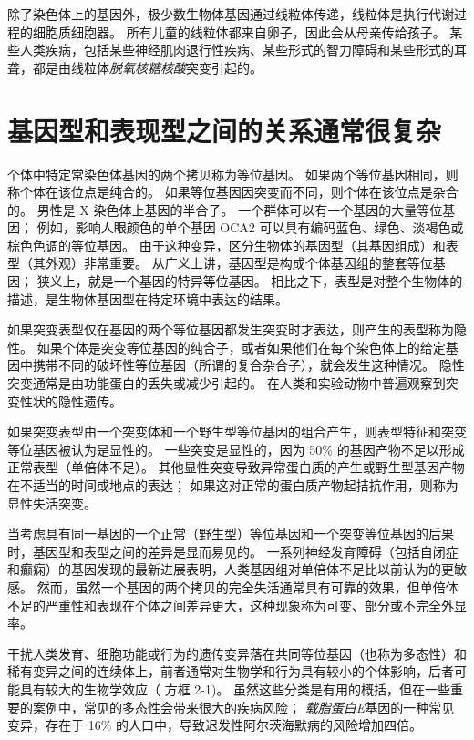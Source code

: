 除了染色体上的基因外，极少数生物体基因通过线粒体传递，线粒体是执行代谢过程的细胞质细胞器。 
所有儿童的线粒体都来自卵子，因此会从母亲传给孩子。 某些人类疾病，包括某些神经肌肉退行性疾病、某些形式的智力障碍和某些形式的耳聋，都是由线粒体\textit{脱氧核糖核酸}突变引起的。


\section{基因型和表现型之间的关系通常很复杂}

个体中特定常染色体基因的两个拷贝称为等位基因。 
如果两个等位基因相同，则称个体在该位点是纯合的。 
如果等位基因因突变而不同，则个体在该位点是杂合的。 男性是 X 染色体上基因的半合子。 
一个群体可以有一个基因的大量等位基因； 
例如，影响人眼颜色的单个基因 OCA2 可以具有编码蓝色、绿色、淡褐色或棕色色调的等位基因。 
由于这种变异，区分生物体的基因型（其基因组成）和表型（其外观）非常重要。 
从广义上讲，基因型是构成个体基因组的整套等位基因； 狭义上，就是一个基因的特异等位基因。 
相比之下，表型是对整个生物体的描述，是生物体基因型在特定环境中表达的结果。

如果突变表型仅在基因的两个等位基因都发生突变时才表达，则产生的表型称为隐性。 
如果个体是突变等位基因的纯合子，或者如果他们在每个染色体上的给定基因中携带不同的破坏性等位基因（所谓的复合杂合子），就会发生这种情况。 
隐性突变通常是由功能蛋白的丢失或减少引起的。 
在人类和实验动物中普遍观察到突变性状的隐性遗传。


如果突变表型由一个突变体和一个野生型等位基因的组合产生，则表型特征和突变等位基因被认为是显性的。 
一些突变是显性的，因为 50\% 的基因产物不足以形成正常表型（单倍体不足）。 
其他显性突变导致异常蛋白质的产生或野生型基因产物在不适当的时间或地点的表达； 
如果这对正常的蛋白质产物起拮抗作用，则称为显性失活突变。


当考虑具有同一基因的一个正常（野生型）等位基因和一个突变等位基因的后果时，基因型和表型之间的差异是显而易见的。 
一系列神经发育障碍（包括自闭症和癫痫）的基因发现的最新进展表明，人类基因组对单倍体不足比以前认为的更敏感。 
然而，虽然一个基因的两个拷贝的完全失活通常具有可靠的效果，但单倍体不足的严重性和表现在个体之间差异更大，这种现象称为可变、部分或不完全外显率。


干扰人类发育、细胞功能或行为的遗传变异落在共同等位基因（也称为多态性）和稀有变异之间的连续体上，前者通常对生物学和行为具有较小的个体影响，后者可能具有较大的生物学效应（ 方框 2-1)。 
虽然这些分类是有用的概括，但在一些重要的案例中，常见的多态性会带来很大的疾病风险； 
\textit{载脂蛋白E}基因的一种常见变异，存在于 16\% 的人口中，导致迟发性阿尔茨海默病的风险增加四倍。



